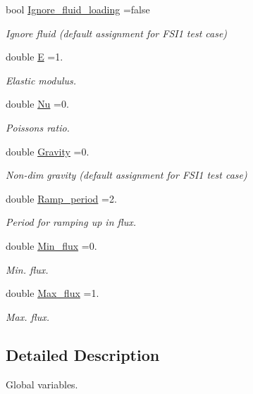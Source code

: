 \begin{DoxyCompactItemize}
bool \hyperlink{namespaceGlobal__Parameters_aac13d615d2acd78d22a3137ffd62f7aa}{Ignore\+\_\+fluid\+\_\+loading} =false
\begin{DoxyCompactList}\small\item\em Ignore fluid (default assignment for F\+S\+I1 test case) \end{DoxyCompactList}\item 
double \hyperlink{namespaceGlobal__Parameters_aa3dfbdb1b2fd80d516850f66c96b6fd0}{E} =1.
\begin{DoxyCompactList}\small\item\em Elastic modulus. \end{DoxyCompactList}\item 
double \hyperlink{namespaceGlobal__Parameters_a20fccdcfa2c15ad8b951b9ada3bb1661}{Nu} =0.
\begin{DoxyCompactList}\small\item\em Poisson\textquotesingle{}s ratio. \end{DoxyCompactList}\item 
double \hyperlink{namespaceGlobal__Parameters_a335000b5db4206486a116ae0468d2d0c}{Gravity} =0.
\begin{DoxyCompactList}\small\item\em Non-\/dim gravity (default assignment for F\+S\+I1 test case) \end{DoxyCompactList}\item 
double \hyperlink{namespaceGlobal__Parameters_af6afcca0b1ffdf88144f99cdfed18d3b}{Ramp\+\_\+period} =2.
\begin{DoxyCompactList}\small\item\em Period for ramping up in flux. \end{DoxyCompactList}\item 
double \hyperlink{namespaceGlobal__Parameters_a5aabde2d31d07e5d0a84f6ff02c263dc}{Min\+\_\+flux} =0.
\begin{DoxyCompactList}\small\item\em Min. flux. \end{DoxyCompactList}\item 
double \hyperlink{namespaceGlobal__Parameters_a13f0d5d16393d21bbc904aea5cff4ea4}{Max\+\_\+flux} =1.
\begin{DoxyCompactList}\small\item\em Max. flux. \end{DoxyCompactList}\end{DoxyCompactItemize}


\subsection{Detailed Description}
Global variables. 

